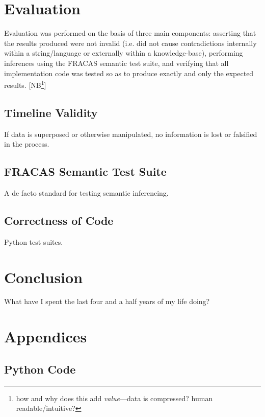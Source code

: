 \documentclass[a4paper,12pt,leqno]{article}
\newcommand{\nb}[1]{{\color{red}[NB\footnote{{\color{red}#1}}]}}
\begin{document}
\newpage
\section{Evaluation}\label{sec:evaluation}
Evaluation was performed on the basis of three main components: asserting that the results produced were not invalid (i.e. did not cause contradictions internally within a string/language or externally within a knowledge-base), performing inferences using the FRACAS semantic test suite, and verifying that all implementation code was tested so as to produce exactly and only the expected results. \nb{how and why does this add \textit{value}---data is compressed? human readable/intuitive?}
\subsection{Timeline Validity}\label{sub:validity}
If data is superposed or otherwise manipulated, no information is lost or falsified in the process.
\subsection{FRACAS Semantic Test Suite}\label{sub:fracas}
A de facto standard for testing semantic inferencing.
\subsection{Correctness of Code}\label{sub:correct}
Python test suites.
\newpage
\section{Conclusion}\label{sec:conclusion}
What have I spent the last four and a half years of my life doing?

\newpage
\pagestyle{empty}
\onehalfspacing


\newpage
\section*{Appendices}
\subsection*{Python Code}
% 
\end{document}

